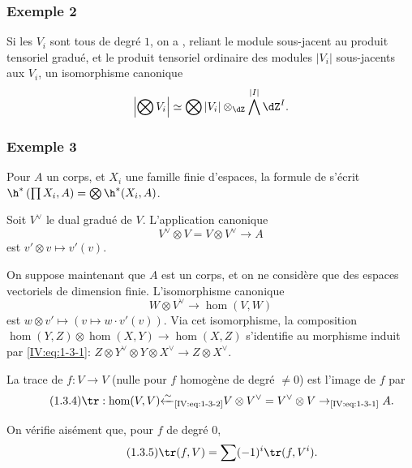 \subsubsection*{Exemple 2}

Si les $V_i$ sont tous de degré $1$, on a , reliant le module sous-jacent au 
produit tensoriel gradué, et le produit tensoriel ordinaire des modules 
$|V_i|$ sous-jacents aux $V_i$, un isomorphisme canonique 
\[
  \left|\bigotimes V_i\right| \simeq \bigotimes |V_i|\otimes_{\dZ}\bigwedge^{|I|}\dZ^I \text{.}
\]





\subsubsection*{Exemple 3}

Pour $A$ un corps, et $X_i$ une famille finie d'espaces, la formule de 
 s'écrit 
$\h^*\left(\prod X_i,A\right) = \bigotimes \h^*(X_i,A)$. 

Soit $V^\vee$ le dual gradué de $V$. L'application canonique 
\begin{equation*}\tag{1.3.1}\label{IV:eq:1-3-1}
  V^\vee\otimes V = V\otimes V^\vee \to A
\end{equation*}
est $v'\otimes v\mapsto v'(v)$. 

On suppose maintenant que $A$ est un corps, et on ne considère que des 
espaces vectoriels de dimension finie. L'isomorphisme canonique 
\begin{equation*}\tag{1.3.2}\label{IV:eq:1-3-2}
  W\otimes V^\vee \to \hom(V,W) 
\end{equation*}
est $w\otimes v'\mapsto \left(v\mapsto w\cdot v'(v)\right)$. Via cet 
isomorphisme, la composition $\hom(Y,Z)\otimes \hom(X,Y)\to \hom(X,Z)$ 
s'identifie au morphisme induit par \eqref{IV:eq:1-3-1}: 
$Z\otimes Y^\vee\otimes Y\otimes X^\vee \to Z\otimes X^\vee$. 

La trace de $f:V\to V$ (nulle pour $f$ homogène de degré $\ne 0$) est 
l'image de $f$ par 
\begin{equation*}\tag{1.3.4}\label{IV:eq:1-3-4}
  \tr:\hom(V,V) {\xleftarrow\sim}_\text{\eqref{IV:eq:1-3-2}} V\otimes V^\vee = V^\vee \otimes V \to_\text{\eqref{IV:eq:1-3-1}} A .
\end{equation*}

On vérifie aisément que, pour $f$ de degré $0$, 
\begin{equation*}\tag{1.3.5}\label{IV:eq:1-3-5}
  \tr(f,V) = \sum (-1)^i \tr(f,V^i) \text{.}
\end{equation*}


